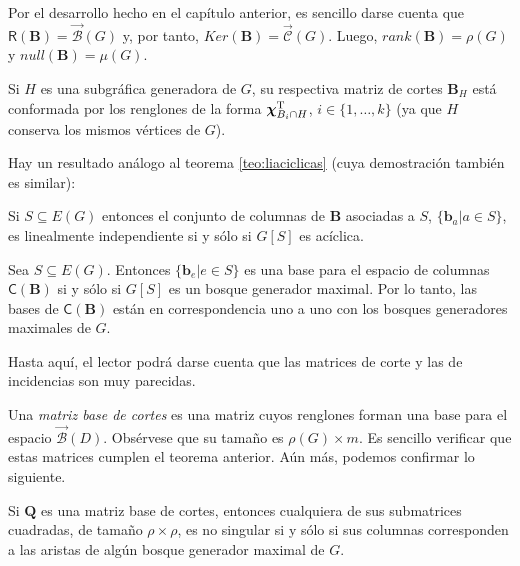  Por el desarrollo hecho en el capítulo anterior, es sencillo darse cuenta que $\mathsf{R}(\mathbf{B}) =\overrightarrow{\mathcal{B}}(G)$ y, por tanto, $Ker(\mathbf{B}) = \overrightarrow{\mathcal{C}}(G)$. Luego, $rank(\mathbf{B}) = \rho(G)$ y $null(\mathbf{B}) = \mu(G)$.
 
Si $H$ es una subgráfica generadora de $G$, su respectiva matriz de cortes $\mathbf{B}_{H}$ está conformada por los renglones de la forma $\boldsymbol{\chi}_{B_{i} \cap H}^{\textnormal{T}}$, $i\in\{1, \ldots, k\}$ (ya que $H$ conserva los mismos vértices de $G$). 

Hay un resultado análogo al teorema \ref{teo:liaciclicas} (cuya demostración también es similar):
\begin{teo}\label{teo:limatrizcortes}
Si $S\subseteq E(G)$ entonces el conjunto de columnas de $\mathbf{B}$ asociadas a $S$, $\{\mathbf{b}_{a}| a \in S\}$, es linealmente independiente si y sólo si $G[S]$ es acíclica.
\end{teo}

\begin{cor} Sea
$S \subseteq E(G)$. Entonces $\{\mathbf{b}_{e} | e \in S\}$ es una base para el espacio de columnas $\mathsf{C}(\mathbf{B})$ si y sólo si $G[S]$ es un bosque generador maximal. Por lo tanto, las bases de $\mathsf{C}(\mathbf{B})$ están en correspondencia uno a uno con los bosques generadores maximales de $G$.
\end{cor} 


Hasta aquí, el lector podrá darse cuenta que las matrices de corte y las de incidencias son muy parecidas.

 Una \textit{matriz base de cortes} es una matriz cuyos renglones forman una base para el espacio $\overrightarrow{\mathcal{B}}(D)$. Obsérvese que su tamaño es $\rho(G) \times m$. Es sencillo verificar que estas matrices cumplen el teorema anterior. Aún más, podemos confirmar lo siguiente.

\begin{teo} \label{teo:submatricesmatridecortes}
Si $\mathbf{Q}$ es una matriz base de cortes, entonces cualquiera de sus submatrices cuadradas, de tamaño $\rho \times \rho$, es no singular si y sólo si sus columnas corresponden a las aristas de algún bosque generador maximal de $G$.
\end{teo}

